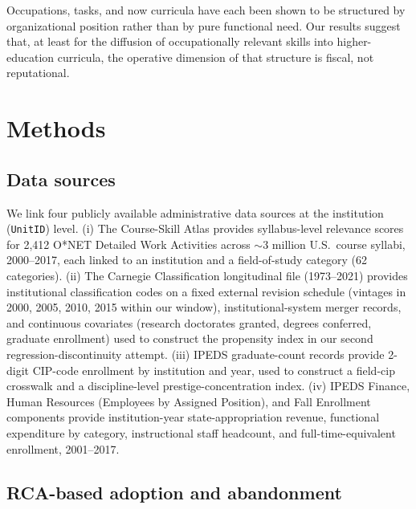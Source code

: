 \documentclass[11pt, letterpaper]{article}
\newcommand{\parencite}[1]{\cite{#1}}
\begin{document}
Occupations, tasks, and now curricula have each been shown to be structured by organizational position rather than by pure functional need. Our results suggest that, at least for the diffusion of occupationally relevant skills into higher-education curricula, the operative dimension of that structure is fiscal, not reputational.

\section*{Methods}

\subsection*{Data sources}

We link four publicly available administrative data sources at the institution (\texttt{UnitID}) level. (i) The Course-Skill Atlas \parencite{javadiansabet2024} provides syllabus-level relevance scores for 2,412 O*NET Detailed Work Activities across $\sim$3 million U.S.\ course syllabi, 2000--2017, each linked to an institution and a field-of-study category (62 categories). (ii) The Carnegie Classification longitudinal file (1973--2021) provides institutional classification codes on a fixed external revision schedule (vintages in 2000, 2005, 2010, 2015 within our window), institutional-system merger records, and continuous covariates (research doctorates granted, degrees conferred, graduate enrollment) used to construct the propensity index in our second regression-discontinuity attempt. (iii) IPEDS graduate-count records provide 2-digit CIP-code enrollment by institution and year, used to construct a field-cip crosswalk and a discipline-level prestige-concentration index. (iv) IPEDS Finance, Human Resources (Employees by Assigned Position), and Fall Enrollment components provide institution-year state-appropriation revenue, functional expenditure by category, instructional staff headcount, and full-time-equivalent enrollment, 2001--2017.

\subsection*{RCA-based adoption and abandonment}
\end{document}
